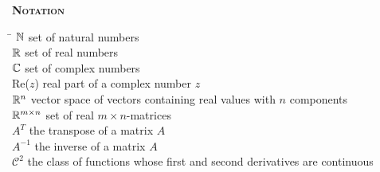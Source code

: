 \documentclass[paper=a4, pagesize, DIV=calc, BCOR=12.5mm, twoside=on, onecolumn=on, open = any, titlepage =on, parskip =half-, headsepline = on, footsepline = on, chapterprefix = on, appendixprefix = off, fontsize = 12pt, numbers = noenddot, abstract = on]{scrbook}
\numberwithin{equation}{chapter}
\theoremstyle{definition}
\theoremstyle{plain}
\theoremstyle{plain}
\theoremstyle{remark}
\theoremstyle{plain}
\theoremstyle{plain}
\begin{document}
\newpage
\thispagestyle{plain}

\newcommand*\diff{\mathop{}\!\mathrm{d}}


\thispagestyle{empty}
\cleardoublepage


\newpage
\Huge
\textbf{\textsc{Notation}}
\normalsize
\onehalfspacing
\vspace{5ex}
\begin{tabbing}
\hspace{3cm}\=\kill
 $\mathbb{N}$\> set of natural numbers \\ 
 $\mathbb{R}$\> set of real numbers \\ 
$\mathbb{C}$ \> set of complex numbers \\ 
Re($z$) \> real part of a complex number $z$\\ 
$\mathbb{R}^n$ \> vector space of vectors containing real values with $n$ components \\ 
$\mathbb{R}^{m\times n}$ \> set of real $m \times n$-matrices\\ 
$A^T$ \> the transpose of a matrix $A$ \\ 
 $A^{-1}$ \> the inverse of a matrix $A$ \\
$\mathcal{C}^2$ \> the class of functions whose first and second derivatives are continuous
\end{tabbing} 
\newpage
\listoffigures
\newpage
\tableofcontents
\thispagestyle{empty}
\cleardoublepage
\newpage
{}
\par \singlespacing
\end{document}
